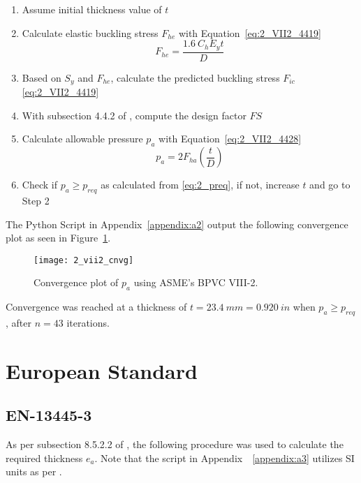 \begin{enumerate}
	\item Assume initial thickness value of $t$
	\item Calculate elastic buckling stress $F_{he}$ with Equation~\ref{eq:2_VII2_4419}
	      \begin{equation}
	      	\label{eq:2_VII2_4419}
	      	F_{he} = \frac{1.6\ C_h E_y t}{D}
	      \end{equation}
	\item Based on $S_y$ and $F_{he}$, calculate the predicted buckling stress $F_{ic}$ \ref{eq:2_VII2_4419}
	\item With subsection 4.4.2 of \cite{ASMEbvpcVII2}, compute the design factor $FS$
	\item Calculate allowable pressure $p_a$ with Equation~\ref{eq:2_VII2_4428}
	      \begin{equation}
	      	\label{eq:2_VII2_4428}
	      	p_a = 2 F_{ha} \left(\frac{t}{D}\right)
	      \end{equation}
	\item Check if $p_a \geq p_{req}$ as calculated from \ref{eq:2_preq}, if not, increase $t$ and go to Step 2 \\
	      	
\end{enumerate}

The Python Script in Appendix~\ref{appendix:a2} output the following convergence plot as seen in Figure~\ref{fig:2_vii2_cnvg}.
\begin{figure}[H]
	\centering
	\texttt{[image: 2\_vii2\_cnvg]}
	\caption{Convergence plot of $p_a$ using ASME's BPVC VIII-2.}
	\label{fig:2_vii2_cnvg}
\end{figure}

Convergence was reached at a thickness of $t = 23.4\ mm = 0.920\ in$ when $p_a\geq p_{req}$, after $n=43$ iterations. 


\section{European Standard}
\subsection{EN-13445-3}
As per subsection 8.5.2.2 of \cite{EN134453}, the following procedure was used to calculate the required thickness $e_a$. Note that the script in Appendix~~\ref{appendix:a3} utilizes SI units as per \cite{EN134453}.

